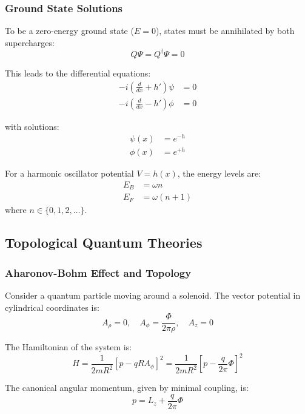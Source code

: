 \subsubsection{Ground State Solutions}

To be a zero-energy ground state ($E = 0$), states must be annihilated by both supercharges:
\begin{equation}
Q\Psi = Q^\dagger\Psi = 0
\end{equation}

This leads to the differential equations:
\begin{align}
-i \left( \frac{d}{dx} + h' \right) \psi &= 0 \\
-i \left( \frac{d}{dx} - h' \right) \phi &= 0
\end{align}

with solutions:
\begin{align}
\psi(x) &= e^{-h} \\
\phi(x) &= e^{+h}
\end{align}

For a harmonic oscillator potential $V = h(x)$, the energy levels are:
\begin{align}
E_{B} &= \omega n \\
E_{F} &= \omega (n+1)
\end{align}
where $n \in \{0, 1, 2, \ldots\}$.

\subsection{Topological Quantum Theories}

\subsubsection{Aharonov-Bohm Effect and Topology}

Consider a quantum particle moving around a solenoid. The vector potential in cylindrical coordinates is:
\begin{equation}
A_\rho = 0, \quad A_\phi = \frac{\Phi}{2\pi \rho}, \quad A_z = 0
\end{equation}

The Hamiltonian of the system is:
\begin{equation}
H = \frac{1}{2mR^2} \left[ p - q R A_\phi \right]^2 = \frac{1}{2mR^2} \left[ p - \frac{q}{2\pi} \Phi \right]^2
\end{equation}

The canonical angular momentum, given by minimal coupling, is:
\begin{equation}
p = L_z + \frac{q}{2\pi} \Phi
\end{equation}

